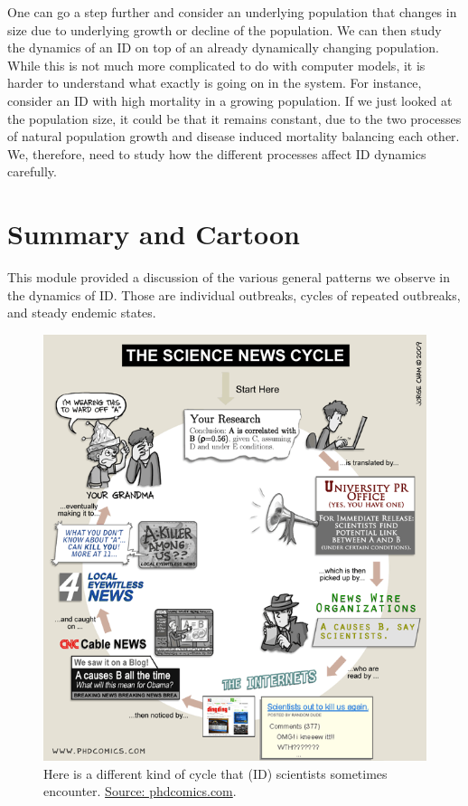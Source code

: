 \documentclass[]{book}
\theoremstyle{definition}
\theoremstyle{definition}
\theoremstyle{definition}
\theoremstyle{remark}
\begin{document}
One can go a step further and consider an underlying population that
changes in size due to underlying growth or decline of the population.
We can then study the dynamics of an ID on top of an already dynamically
changing population. While this is not much more complicated to do with
computer models, it is harder to understand what exactly is going on in
the system. For instance, consider an ID with high mortality in a
growing population. If we just looked at the population size, it could
be that it remains constant, due to the two processes of natural
population growth and disease induced mortality balancing each other.
We, therefore, need to study how the different processes affect ID
dynamics carefully.

\section{Summary and Cartoon}\label{summary-and-cartoon-2}

This module provided a discussion of the various general patterns we
observe in the dynamics of ID. Those are individual outbreaks, cycles of
repeated outbreaks, and steady endemic states.

\begin{figure}
\centering
\includegraphics{./images/phd_sciencenewscycle.png}
\caption{\label{fig:sciencenewscycle}Here is a different kind of cycle that
(ID) scientists sometimes encounter.
\href{http://www.phdcomics.com/comics/archive.php?comicid=1174}{Source:
phdcomics.com}.}
\end{figure}
\end{document}
